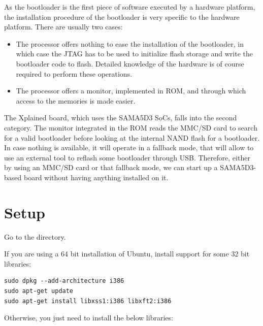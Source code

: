 
As the bootloader is the first piece of software executed by a
hardware platform, the installation procedure of the bootloader is
very specific to the hardware platform. There are usually two cases:

\begin{itemize}

\item The processor offers nothing to ease the installation of the
  bootloader, in which case the JTAG has to be used to initialize
  flash storage and write the bootloader code to flash. Detailed
  knowledge of the hardware is of course required to perform these
  operations.

\item The processor offers a monitor, implemented in ROM, and through
  which access to the memories is made easier.

\end{itemize}

The Xplained board, which uses the SAMA5D3 SoCs, falls into the second
category. The monitor integrated in the ROM reads the MMC/SD card to
search for a valid bootloader before looking at the internal NAND
flash for a bootloader. In case nothing is available, it will operate
in a fallback mode, that will allow to use an external tool
to reflash some bootloader through USB. Therefore, either by using an MMC/SD
card or that fallback mode, we can start up a SAMA5D3-based board
without having anything installed on it.

\section{Setup}

Go to the  directory.

If you are using a 64 bit installation of Ubuntu, install support for
some 32 bit libraries:

\begin{verbatim}
sudo dpkg --add-architecture i386
sudo apt-get update
sudo apt-get install libxss1:i386 libxft2:i386
\end{verbatim}

Otherwise, you just need to install the below libraries:

